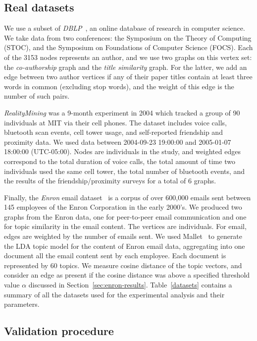 \documentclass{article}
\begin{document}
\subsection{Real datasets} 
We use a subset of \emph{DBLP}~\cite{Ley02}, an online database of research in
computer science. We take data from two conferences: the Symposium on the
Theory of Computing (STOC), and the Symposium on Foundations of Computer
Science (FOCS). Each of the 3153 nodes represents an author, and we use two
graphs on this vertex set: the {\em co-authorship} graph and the {\em title
similarity} graph. For the latter, we add an edge between two author vertices
if any of their paper titles contain at least three words in common (excluding
stop words), and the weight of this edge is the number of such pairs.

\emph{RealityMining} \cite{RealityMining} was a 9-month experiment in 2004
which tracked a group of 90 individuals at MIT via their cell phones. The
dataset includes voice calls, bluetooth scan events, cell tower usage, and
self-reported friendship and proximity data. We used data between 2004-09-23
19:00:00 and 2005-01-07 18:00:00 (UTC-05:00). Nodes are individuals in the
study, and weighted edges correspond to the total duration of voice calls, the
total amount of time two individuals used the same cell tower, the total number
of bluetooth events, and the results of the friendship/proximity surveys for a
total of 6 graphs. 

Finally, the \emph{Enron} email dataset~\cite{EnronConf} is a corpus of
over 600,000 emails sent between 145 employees of the Enron Corporation in the
early 2000's. We produced two graphs from the Enron data, one for peer-to-peer
email communication and one for topic similarity in the email content. The
vertices are individuals. For email, edges are weighted by the
number of emails sent. We used Mallet~\cite{mallet} to generate the LDA topic
model for the content of Enron email data, aggregating into one document all
the email content sent by each employee. Each document is represented by 60
topics. We measure cosine distance of the topic vectors, and consider an edge
as present if the cosine distance was above a specified threshold value
$\alpha$ discussed in Section~\ref{sec:enron-results}. Table~\ref{datasets}
contains a summary of all the datasets used for the experimental analysis and
their parameters. 


\subsection{Validation procedure} \label{sec:validation}
\end{document}
